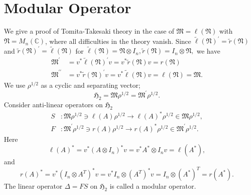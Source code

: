 \section{Modular Operator}
We give a proof  of Tomita-Takesaki theory in the case of 
$\mathfrak{M}=\ell(\mathfrak{N})$ with $\mathfrak{N}=M_n(\mathbb{C})$,
where all difficulties in the theory vanish.
Since
$\tilde{\ell}(\mathfrak{N})^\prime=\tilde{r}(\mathfrak{N})$ and $\tilde{r}(\mathfrak{N})^\prime=\tilde{\ell}(\mathfrak{N})$ for 
$
\tilde{\ell}(\mathfrak{N})=\mathfrak{N}\otimes I_n,\tilde{r}(\mathfrak{N})=I_n\otimes \mathfrak{N},
$
we have
\begin{equation}
\begin{split}
\mathfrak{M}^\prime&=v^\ast \tilde{\ell}(\mathfrak{N})^\prime v= v^\ast \tilde{r}(\mathfrak{N})v=r(\mathfrak{N}) \\
\mathfrak{M}^{\prime\prime}&=v^\ast \tilde{r}(\mathfrak{N})^\prime v= v^\ast \tilde{\ell}(\mathfrak{N})v=\ell(\mathfrak{N})=\mathfrak{M}.
\end{split}
\end{equation}
We use $\rho^{1/2}$ as a cyclic and separating vector;
$$
\mathfrak{H}_2=\mathfrak{M}\rho^{1/2}=\mathfrak{M}^\prime \rho^{1/2}.
$$
 Consider  anti-linear operators on $\mathfrak{H}_2$ 
\begin{equation}\label{SF}
	 \begin{split}
		 S&:\mathfrak{M}\rho^{1/2}\ni \ell(A) \rho^{1/2} \to \ell(A)^\ast\rho^{1/2}\in\mathfrak{M}\rho^{1/2},\\
		 F&:\mathfrak{M}^\prime \rho^{1/2}\ni r(A) \rho^{1/2} \to r(A)^\ast\rho^{1/2}\in \mathfrak{M}^\prime \rho^{1/2}.
	 \end{split}
\end{equation}
	Here 
	$$
	\ell(A)^\ast=v^\ast(A\otimes I_n)^\ast v=v^\ast A^\ast \otimes I_n v=\ell(A^\ast),
	$$
	and
	$$
  r(A)^\ast=v^\ast (I_n\otimes A^T)^\ast v=v^\ast I_n\otimes (A^T)^\ast v=I_n\otimes (A^\ast)^T=r(A^\ast).
	$$
	The linear operator $\Delta=FS$ on $\mathfrak{H}_2$ is called a modular operator.

